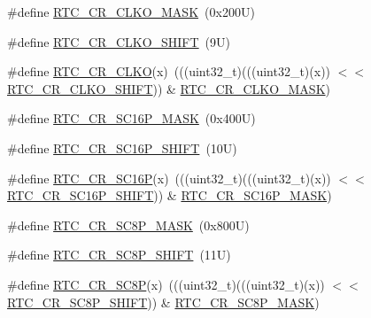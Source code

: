 \begin{DoxyCompactItemize}
\item 
\#define \mbox{\hyperlink{group___r_t_c___register___masks_ga4c9ab830040b30f5ebc3e21f357e3d58}{R\+T\+C\+\_\+\+C\+R\+\_\+\+C\+L\+K\+O\+\_\+\+M\+A\+SK}}~(0x200\+U)
\item 
\#define \mbox{\hyperlink{group___r_t_c___register___masks_ga0c53e02399574c63f5015cef513dddff}{R\+T\+C\+\_\+\+C\+R\+\_\+\+C\+L\+K\+O\+\_\+\+S\+H\+I\+FT}}~(9\+U)
\item 
\#define \mbox{\hyperlink{group___r_t_c___register___masks_ga227514fe8e96217ffd352795835630d0}{R\+T\+C\+\_\+\+C\+R\+\_\+\+C\+L\+KO}}(x)~(((uint32\+\_\+t)(((uint32\+\_\+t)(x)) $<$$<$ \mbox{\hyperlink{group___r_t_c___register___masks_ga0c53e02399574c63f5015cef513dddff}{R\+T\+C\+\_\+\+C\+R\+\_\+\+C\+L\+K\+O\+\_\+\+S\+H\+I\+FT}})) \& \mbox{\hyperlink{group___r_t_c___register___masks_ga4c9ab830040b30f5ebc3e21f357e3d58}{R\+T\+C\+\_\+\+C\+R\+\_\+\+C\+L\+K\+O\+\_\+\+M\+A\+SK}})
\item 
\#define \mbox{\hyperlink{group___r_t_c___register___masks_ga885a0abaf0aeae2525406950542df145}{R\+T\+C\+\_\+\+C\+R\+\_\+\+S\+C16\+P\+\_\+\+M\+A\+SK}}~(0x400\+U)
\item 
\#define \mbox{\hyperlink{group___r_t_c___register___masks_gafefab96f792c2faf1c4580790af7a1c5}{R\+T\+C\+\_\+\+C\+R\+\_\+\+S\+C16\+P\+\_\+\+S\+H\+I\+FT}}~(10\+U)
\item 
\#define \mbox{\hyperlink{group___r_t_c___register___masks_gabdf20af79baf9729aa673ec4155bd92d}{R\+T\+C\+\_\+\+C\+R\+\_\+\+S\+C16P}}(x)~(((uint32\+\_\+t)(((uint32\+\_\+t)(x)) $<$$<$ \mbox{\hyperlink{group___r_t_c___register___masks_gafefab96f792c2faf1c4580790af7a1c5}{R\+T\+C\+\_\+\+C\+R\+\_\+\+S\+C16\+P\+\_\+\+S\+H\+I\+FT}})) \& \mbox{\hyperlink{group___r_t_c___register___masks_ga885a0abaf0aeae2525406950542df145}{R\+T\+C\+\_\+\+C\+R\+\_\+\+S\+C16\+P\+\_\+\+M\+A\+SK}})
\item 
\#define \mbox{\hyperlink{group___r_t_c___register___masks_gac8a4d2f3837af6cea3924682d6d795c9}{R\+T\+C\+\_\+\+C\+R\+\_\+\+S\+C8\+P\+\_\+\+M\+A\+SK}}~(0x800\+U)
\item 
\#define \mbox{\hyperlink{group___r_t_c___register___masks_ga4bb07384fbca5f19f9e7b30daa071b92}{R\+T\+C\+\_\+\+C\+R\+\_\+\+S\+C8\+P\+\_\+\+S\+H\+I\+FT}}~(11\+U)
\item 
\#define \mbox{\hyperlink{group___r_t_c___register___masks_gae339c78e8f2d1fc58e9a0adad68a537a}{R\+T\+C\+\_\+\+C\+R\+\_\+\+S\+C8P}}(x)~(((uint32\+\_\+t)(((uint32\+\_\+t)(x)) $<$$<$ \mbox{\hyperlink{group___r_t_c___register___masks_ga4bb07384fbca5f19f9e7b30daa071b92}{R\+T\+C\+\_\+\+C\+R\+\_\+\+S\+C8\+P\+\_\+\+S\+H\+I\+FT}})) \& \mbox{\hyperlink{group___r_t_c___register___masks_gac8a4d2f3837af6cea3924682d6d795c9}{R\+T\+C\+\_\+\+C\+R\+\_\+\+S\+C8\+P\+\_\+\+M\+A\+SK}})
$$
\end{DoxyCompactItemize}

